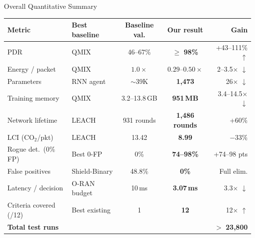 \documentclass[10pt,aspectratio=169]{beamer}
\begin{document}
\begin{frame}{Overall Quantitative Summary}
\centering
\small
\renewcommand{\arraystretch}{1.15}
\begin{tabular}{@{}llccr@{}}
  \toprule
  \textbf{Metric} & \textbf{Best baseline} & \textbf{Baseline val.} & \textbf{Our result} & \textbf{Gain} \\
  \midrule
  PDR & QMIX & 46--67\% & $\geq$ \textbf{98\%} & +43--111\% $\uparrow$ \\
  Energy / packet & QMIX & $1.0\times$ & $0.29$--$0.50\times$ & 2--3.5$\times$ $\downarrow$ \\
  Parameters & RNN agent & $\sim$39K & \textbf{1,473} & 26$\times$ $\downarrow$ \\
  Training memory & QMIX & 3.2--13.8\,GB & \textbf{951\,MB} & 3.4--14.5$\times$ $\downarrow$ \\
  Network lifetime & LEACH & 931 rounds & \textbf{1,486 rounds} & +60\% \\
  LCI (CO$_2$/pkt) & LEACH & 13.42 & \textbf{8.99} & $-$33\% \\
  Rogue det.\ (0\% FP) & Best 0-FP & 0\% & \textbf{74--98\%} & +74--98 pts \\
  False positives & Shield-Binary & 48.8\% & \textbf{0\%} & Full elim. \\
  Latency / decision & O-RAN budget & 10\,ms & \textbf{3.07\,ms} & 3.3$\times$ $\downarrow$ \\
  Criteria covered (/12) & Best existing & 1 & \textbf{12} & 12$\times$ $\uparrow$ \\
  \midrule
  \multicolumn{4}{l}{\textbf{Total test runs}} & $>$ \textbf{23,800} \\
  \bottomrule
\end{tabular}
\end{frame}
\end{document}
